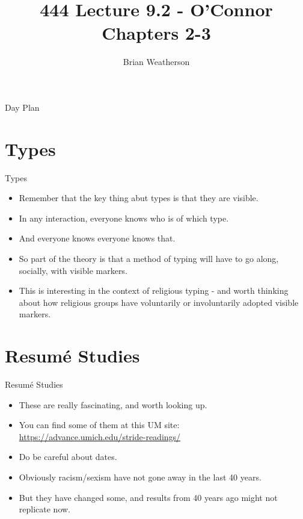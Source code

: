\documentclass[
  ignorenonframetext,
]{beamer}
\title{444 Lecture 9.2 - O'Connor Chapters 2-3}
\author{Brian Weatherson}
\date{}
\providecommand{\tightlist}{%
  \setlength{\itemsep}{0pt}\setlength{\parskip}{0pt}}
\begin{document}
\frame{\titlepage}

\begin{frame}{Day Plan}
\protect\hypertarget{day-plan}{}
\tableofcontents
\end{frame}

\hypertarget{types}{%
\section{Types}\label{types}}

\begin{frame}{Types}
\protect\hypertarget{types-1}{}
\begin{itemize}
\tightlist
\item
  Remember that the key thing abut types is that they are visible.
\item
  In any interaction, everyone knows who is of which type.
\item
  And everyone knows everyone knows that.
\item
  So part of the theory is that a method of typing will have to go
  along, socially, with visible markers.
\item
  This is interesting in the context of religious typing - and worth
  thinking about how religious groups have voluntarily or involuntarily
  adopted visible markers.
\end{itemize}
\end{frame}

\hypertarget{resumuxe9-studies}{%
\section{Resumé Studies}\label{resumuxe9-studies}}

\begin{frame}{Resumé Studies}
\protect\hypertarget{resumuxe9-studies-1}{}
\begin{itemize}
\tightlist
\item
  These are really fascinating, and worth looking up.
\item
  You can find some of them at this UM site:
  \url{https://advance.umich.edu/stride-readings/}
\item
  Do be careful about dates.
\item
  Obviously racism/sexism have not gone away in the last 40 years.
\item
  But they have changed some, and results from 40 years ago might not
  replicate now.
\end{itemize}
\end{frame}
\end{document}
